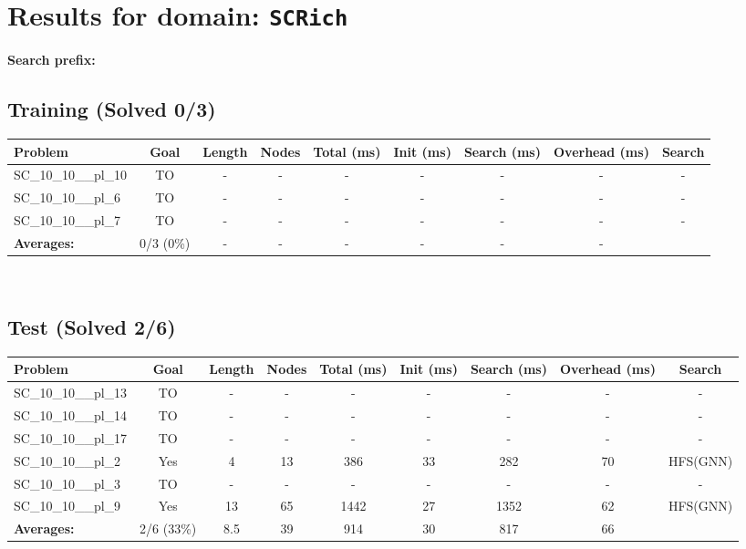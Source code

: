 \documentclass{article}
\begin{document}
\section*{Results for domain: \texttt{SCRich}}
\textbf{Search prefix:} 
\\[0.5cm]
\subsection*{Training (Solved 0/3)}
\begin{tabular}{lcccccccc}
\toprule
Problem & Goal & Length & Nodes & Total (ms) & Init (ms) & Search (ms) & Overhead (ms) & Search \\
\midrule
SC\_10\_10\_\_pl\_10 & TO & - & - & - & - & - & - & - \\
SC\_10\_10\_\_pl\_6 & TO & - & - & - & - & - & - & - \\
SC\_10\_10\_\_pl\_7 & TO & - & - & - & - & - & - & - \\
\textbf{Averages:} & 0/3 (0\%) & - & - & - & - & - & - & \\
\bottomrule
\end{tabular}
\\[0.7cm]
\subsection*{Test (Solved 2/6)}
\begin{tabular}{lcccccccc}
\toprule
Problem & Goal & Length & Nodes & Total (ms) & Init (ms) & Search (ms) & Overhead (ms) & Search \\
\midrule
SC\_10\_10\_\_pl\_13 & TO & - & - & - & - & - & - & - \\
SC\_10\_10\_\_pl\_14 & TO & - & - & - & - & - & - & - \\
SC\_10\_10\_\_pl\_17 & TO & - & - & - & - & - & - & - \\
SC\_10\_10\_\_pl\_2 & Yes & 4 & 13 & 386 & 33 & 282 & 70 & HFS(GNN) \\
SC\_10\_10\_\_pl\_3 & TO & - & - & - & - & - & - & - \\
SC\_10\_10\_\_pl\_9 & Yes & 13 & 65 & 1442 & 27 & 1352 & 62 & HFS(GNN) \\
\textbf{Averages:} & 2/6 (33\%) & 8.5 & 39 & 914 & 30 & 817 & 66 & \\
\bottomrule
\end{tabular}
\\[0.7cm]
\end{document}
